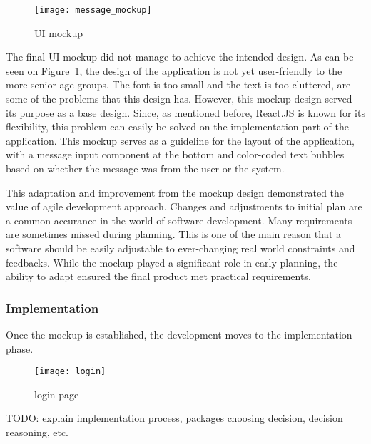\begin{figure}[h!]
    \centering
    \texttt{[image: message\_mockup]}
    \caption{\ac{UI} mockup}\label{mockup}
\end{figure}

The final \ac{UI} mockup did not manage to achieve the intended design.
As can be seen on Figure~\ref{mockup}, the design of the application is not yet user-friendly to the more senior age groups.
The font is too small and the text is too cluttered, are some of the problems that this design has.
However, this mockup design served its purpose as a base design.
Since, as mentioned before, React.JS is known for its flexibility, this problem can easily be solved on the implementation part of the application. 
This mockup serves as a guideline for the layout of the application, with a message input component at the bottom and color-coded text bubbles based on whether the message was from the user or the system.

This adaptation and improvement from the mockup design demonstrated the value of agile development approach.
Changes and adjustments to initial plan are a common accurance in the world of software development.
Many requirements are sometimes missed during planning.
This is one of the main reason that a software should be easily adjustable to ever-changing real world constraints and feedbacks.
While the mockup played a significant role in early planning, the ability to adapt ensured the final product met practical requirements.
 
\subsubsection{Implementation}

Once the mockup is established, the development moves to the implementation phase.

\begin{figure}[h!]
    \centering
    \texttt{[image: login]}
    \caption{login page}\label{login}
\end{figure}

TODO: explain implementation process, packages choosing decision, decision reasoning, etc.